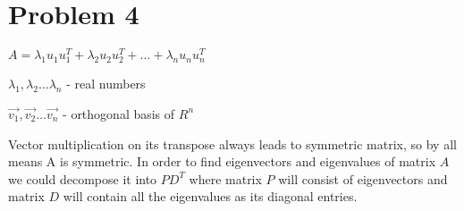\documentclass[12pt,letterpaper]{article}
\begin{document}
\section*{Problem 4}
     $A = \lambda_1u_1u_1^T + \lambda_2u_2u_2^T + \dots + \lambda_nu_nu_n^T$
        
        $\lambda_1, \lambda_2 \dots \lambda_n$ - real numbers
        
        $\vec{v_1}, \vec{v_2} \dots \vec{v_n}$ - orthogonal basis of $R^n$
        
        Vector multiplication on its transpose always leads to symmetric matrix, so by all means A is symmetric.
        In order to find eigenvectors and eigenvalues of matrix $A$ we could decompose it into $PD^T$ where matrix $P$ will consist of eigenvectors and matrix $D$ will contain all the eigenvalues as its diagonal entries.
        
\end{document}
